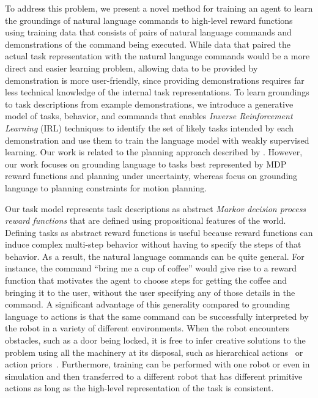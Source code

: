 \documentclass[conference]{IEEEtran}
\begin{document}
To address this problem, we present a novel method for training an
agent to learn the groundings of natural language commands to
high-level reward functions using training data that consists of pairs
of natural language commands and demonstrations of the command being
executed.  While data that paired the actual task representation with
the natural language commands would be a more direct and easier
learning problem, allowing data to be provided by demonstration is
more user-friendly, since providing demonstrations requires far less
technical knowledge of the internal task representations. To learn
groundings to task descriptions from example demonstrations, we
introduce a generative model of tasks, behavior, and commands that
enables {\em Inverse Reinforcement Learning} (IRL) \cite{ng00}
techniques to identify the set of likely tasks intended by each
demonstration and use them to train the language model with weakly
supervised learning.  Our work is related to the planning approach
described by \citet{howard14}. However, our work focuses on grounding language to
tasks best represented by MDP reward functions and planning under
uncertainty, whereas \citet{howard14} focus on grounding language to
planning constraints for motion planning.



Our task model represents task descriptions as abstract \emph{Markov
  decision process reward functions} that are defined using
propositional features of the world. Defining tasks as abstract reward
functions is useful because reward functions can induce complex
multi-step behavior without having to specify the steps of that
behavior. As a result, the natural language commands can be quite
general. For instance, the command ``bring me a cup of coffee'' would
give rise to a reward function that motivates the agent to choose
steps for getting the coffee and bringing it to the user, without the
user specifying any of those details in the command. A significant
advantage of this generality compared to grounding language to actions
is that the same command can be successfully interpreted by the robot
in a variety of different environments.  When the robot encounters
obstacles, such as a door being locked, it is free to infer creative
solutions to the problem using all the machinery at its disposal, such
as hierarchical actions~\citep{sutton99} or action
priors~\citep{abel14}. Furthermore, training can be
performed with one robot or even in simulation and then transferred to
a different robot that has different primitive actions as long as the
high-level representation of the task is consistent.
\end{document}

